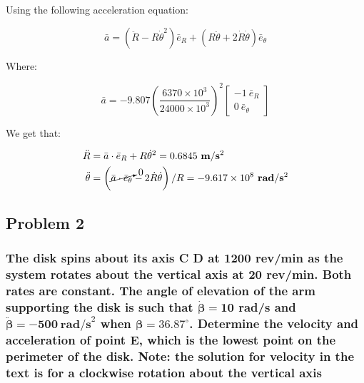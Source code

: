 \documentclass[12pt, letterpaper]{../assignment}
\begin{document}
Using the following acceleration equation:

$$ \bar{a} = \left( \ddot{R} - R \dot{\theta}^2 \right)\bar{e}_R +
\left( R\ddot{\theta} + 2\dot{R}\dot{\theta} \right)\bar{e}_\theta$$

Where:

$$ \bar{a} = -9.807\left(\frac{6370 \times 10^3}{24000 \times 10^3}\right)^2
\left[\begin{array}{rr} -1\ \bar{e}_R\\ 0 \ \bar{e}_\theta \end{array}\right] $$

We get that:

\begin{answer}
\begin{equation*}
    \begin{aligned}
        \ddot{R} &= \bar{a} \cdot \bar{e}_R + R \dot{\theta}^2
        = 0.6845  \ \textbf{m}/\textbf{s}^2\\
        \ddot{\theta}& = \left( \cancelto{0}{\bar{a} \cdot \bar{e}_\theta} - 2\dot{R}\dot{\theta} \right)/R = 
        -9.617\times 10^8 \ \textbf{rad}/\textbf{s}^2
    \end{aligned}
\end{equation*}
\end{answer}

\subsection*{Problem 2}
\subsubsection*{The disk spins about its axis C D at 1200 rev/min as the system rotates about the vertical axis at 20 rev/min.
Both rates are constant.
The angle of elevation of the arm supporting the disk is such that $\bm{\dot{\beta} = 10}$ rad/s and $\bm{\ddot{\beta} = -500}\ \textbf{rad/s}^2$  when $\bm{\beta = 36.87^\circ}$.
Determine the velocity and acceleration of point E,
which is the lowest point on the perimeter of the disk.
Note: the solution for velocity in the text is for a clockwise rotation about the vertical axis}
\end{document}
